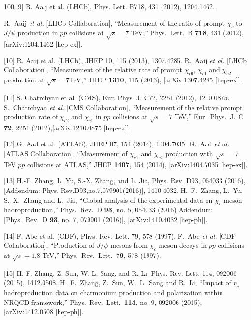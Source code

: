 \documentclass[aps,prc,preprint]{revtex4}
\begin{document}
\begin{thebibliography}{100}
[9] R. Aaij et al. (LHCb), Phys. Lett. B718, 431 (2012), 1204.1462.

  R.~Aaij {\it et al.} [LHCb Collaboration],
  ``Measurement of the ratio of prompt $\chi_{c}$ to $J/\psi$ production in $pp$ collisions at $\sqrt{s}=7$ TeV,''
  Phys.\ Lett.\ B {\bf 718}, 431 (2012),[arXiv:1204.1462 [hep-ex]].


  [10] R. Aaij et al. (LHCb), JHEP 10, 115 (2013), 1307.4285.
  R.~Aaij {\it et al.} [LHCb Collaboration],
  ``Measurement of the relative rate of prompt $\chi_{c0}$, $\chi_{c1}$ and $\chi_{c2}$ production at $\sqrt{s}=7$TeV,''
  JHEP {\bf 1310}, 115 (2013), [arXiv:1307.4285 [hep-ex]].
 
[11] S. Chatrchyan et al. (CMS), Eur. Phys. J. C72, 2251 (2012), 1210.0875.
  S.~Chatrchyan {\it et al.} [CMS Collaboration],
  ``Measurement of the relative prompt production rate of $\chi_{c2}$ and $\chi_{c1}$ 
  in $pp$ collisions at $\sqrt{s}=7$ TeV,''
  Eur.\ Phys.\ J.\ C {\bf 72}, 2251 (2012),[arXiv:1210.0875 [hep-ex]].

[12] G. Aad et al. (ATLAS), JHEP 07, 154 (2014), 1404.7035.
  G.~Aad {\it et al.} [ATLAS Collaboration],
  ``Measurement of $\chi_{c1}$ and $\chi_{c2}$ production with $\sqrt{s}$ = 7 TeV $pp$ collisions at ATLAS,''
  JHEP {\bf 1407}, 154 (2014), [arXiv:1404.7035 [hep-ex]].

[13] H.-F. Zhang, L. Yu, S.-X. Zhang, and L. Jia, Phys. Rev. D93, 054033 (2016), 
 [Addendum: Phys. Rev.D93,no.7,079901(2016)], 1410.4032.
  H.~F.~Zhang, L.~Yu, S.~X.~Zhang and L.~Jia,
  ``Global analysis of the experimental data on $\chi_c$ meson hadroproduction,''
  Phys.\ Rev.\ D {\bf 93}, no. 5, 054033 (2016) Addendum: [Phys.\ Rev.\ D {\bf 93}, no. 7, 079901 (2016)], 
  [arXiv:1410.4032 [hep-ph]].

  [14] F. Abe et al. (CDF), Phys. Rev. Lett. 79, 578 (1997).
  F.~Abe {\it et al.} [CDF Collaboration],
  ``Production of $J/\psi$ mesons from $\chi_c$ meson decays in $p\bar{p}$ collisions at $\sqrt{s} = 1.8$ TeV,''
  Phys.\ Rev.\ Lett.\  {\bf 79}, 578 (1997).


[15] H.-F. Zhang, Z. Sun, W.-L. Sang, and R. Li, Phys. Rev. Lett. 114, 092006 (2015), 1412.0508.
  H.~F.~Zhang, Z.~Sun, W.~L.~Sang and R.~Li,
  ``Impact of $\eta_c$ hadroproduction data on charmonium production and polarization within NRQCD framework,''
  Phys.\ Rev.\ Lett.\  {\bf 114}, no. 9, 092006 (2015), [arXiv:1412.0508 [hep-ph]].
  
\end{thebibliography}
\end{document}
